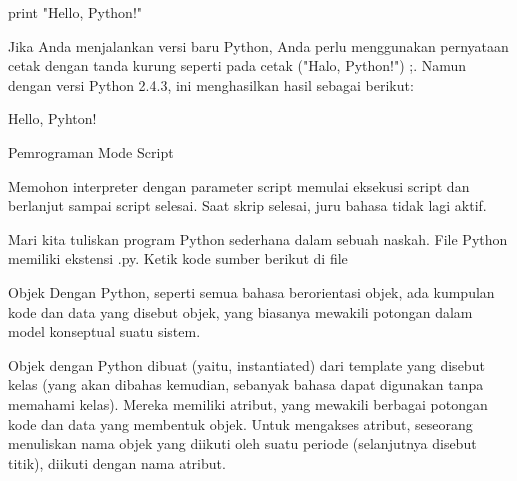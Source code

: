\vspace{14pt}
\noindent 
{\fontsize{14pt}{14pt}\selectfont print "Hello, Python!" \\} \par
\vspace{14pt}
\noindent 
{\fontsize{14pt}{14pt}\selectfont Jika Anda menjalankan versi baru Python, Anda perlu menggunakan pernyataan cetak dengan tanda kurung seperti pada cetak ("Halo, Python!") ;. Namun dengan versi Python 2.4.3, ini menghasilkan hasil sebagai berikut: \\} \par
\vspace{14pt}
\noindent 
{\fontsize{14pt}{14pt}\selectfont Hello, Pyhton! \\} \par
\vspace{14pt}
\noindent 
{\fontsize{14pt}{14pt}\selectfont Pemrograman Mode Script \\} \par
\noindent 
{\fontsize{14pt}{14pt}\selectfont Memohon interpreter dengan parameter script memulai eksekusi script dan berlanjut sampai script selesai. Saat skrip selesai, juru bahasa tidak lagi aktif. \\} \par
\vspace{14pt}
\noindent 
{\fontsize{14pt}{14pt}\selectfont Mari kita tuliskan program Python sederhana dalam sebuah naskah. File Python memiliki ekstensi .py. Ketik kode sumber berikut di file \\} \par
\vspace{14pt}
\noindent 
{\fontsize{14pt}{14pt}\selectfont Objek Dengan Python, seperti semua bahasa berorientasi objek, ada kumpulan kode dan data yang disebut objek, yang biasanya mewakili potongan dalam model konseptual suatu sistem. \\} \par
\vspace{14pt}
\noindent 
{\fontsize{14pt}{14pt}\selectfont Objek dengan Python dibuat (yaitu, instantiated) dari template yang disebut kelas (yang akan dibahas kemudian, sebanyak bahasa dapat digunakan tanpa memahami kelas). Mereka memiliki atribut, yang mewakili berbagai potongan kode dan data yang membentuk objek. Untuk mengakses atribut, seseorang menuliskan nama objek yang diikuti oleh suatu periode (selanjutnya disebut titik), diikuti dengan nama atribut. \\} \par
\vspace{14pt}
